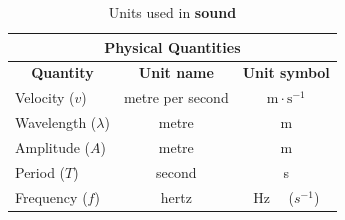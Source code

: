 
\begin{table}[H]
\begin{center}
\begin{tabular}{|l|c|c|}\hline \hline 
\multicolumn{3}{|c|}{\textbf{Physical Quantities}}\\ \hline \hline
\multicolumn{1}{|c|}{\textbf{Quantity}} & \textbf{Unit name} & \textbf{Unit symbol}\\ \hline
Velocity ($v$) & metre per second & $\text{m} \cdot \text{s}^{-1}$ \\ \hline
Wavelength ($\lambda$) & metre & m \\ \hline
Amplitude ($A$) & metre & m \\ \hline
Period ($T$) & second & s \\ \hline
Frequency ($f$) & hertz & Hz \ \ ($s^{-1}$) \\ \hline
\end{tabular}
\end{center}
\caption{Units used in \textbf{sound} }
\label{table:sound::units}
\end{table}
\pagebreak

